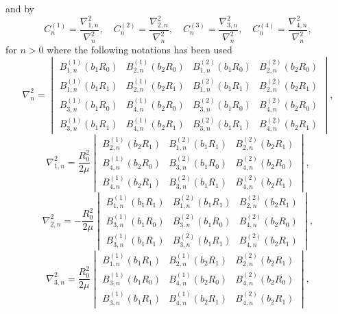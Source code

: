 and by
\begin{equation*}
	C_n^{(1)} = \frac{\nabla^2_{1,n}}{\nabla^2_n},\quad C_n^{(2)} = \frac{\nabla^2_{2,n}}{\nabla^2_n},\quad C_n^{(3)} = \frac{\nabla^2_{3,n}}{\nabla^2_n},\quad C_n^{(4)} = \frac{\nabla^2_{4,n}}{\nabla^2_n},
\end{equation*}
for $n>0$ where the following notations has been used
\begin{equation*}
	\nabla^2_n = \begin{vmatrix}
		B_{1,n}^{(1)}(b_1 R_0) & B_{2,n}^{(1)}(b_2 R_0) & B_{1,n}^{(2)}(b_1 R_0) & B_{2,n}^{(2)}(b_2 R_0)\\
		B_{1,n}^{(1)}(b_1 R_1) & B_{2,n}^{(1)}(b_2 R_1) & B_{1,n}^{(2)}(b_1 R_1) & B_{2,n}^{(2)}(b_2 R_1)\\
		B_{3,n}^{(1)}(b_1 R_0) & B_{4,n}^{(1)}(b_2 R_0) & B_{3,n}^{(2)}(b_1 R_0) & B_{4,n}^{(2)}(b_2 R_0)\\
		B_{3,n}^{(1)}(b_1 R_1) & B_{4,n}^{(1)}(b_2 R_1) & B_{3,n}^{(2)}(b_1 R_1) & B_{4,n}^{(2)}(b_2 R_1)
	\end{vmatrix},
\end{equation*}
\begin{equation*}
	\nabla^2_{1,n} = \frac{R_0^2}{2\mu}\begin{vmatrix}
		B_{2,n}^{(1)}(b_2 R_1) & B_{1,n}^{(2)}(b_1 R_1) & B_{2,n}^{(2)}(b_2 R_1)\\
		B_{4,n}^{(1)}(b_2 R_0) & B_{3,n}^{(2)}(b_1 R_0) & B_{4,n}^{(2)}(b_2 R_0)\\
		B_{4,n}^{(1)}(b_2 R_1) & B_{3,n}^{(2)}(b_1 R_1) & B_{4,n}^{(2)}(b_2 R_1)
	\end{vmatrix},
\end{equation*}
\begin{equation*}
	\nabla^2_{2,n} = -\frac{R_0^2}{2\mu}\begin{vmatrix}
		B_{1,n}^{(1)}(b_1 R_1) & B_{1,n}^{(2)}(b_1 R_1) & B_{2,n}^{(2)}(b_2 R_1)\\
		B_{3,n}^{(1)}(b_1 R_0) & B_{3,n}^{(2)}(b_1 R_0) & B_{4,n}^{(2)}(b_2 R_0)\\
		B_{3,n}^{(1)}(b_1 R_1) & B_{3,n}^{(2)}(b_1 R_1) & B_{4,n}^{(2)}(b_2 R_1)
	\end{vmatrix},
\end{equation*}
\begin{equation*}
	\nabla^2_{3,n} = \frac{R_0^2}{2\mu}\begin{vmatrix}
		B_{1,n}^{(1)}(b_1 R_1) & B_{2,n}^{(1)}(b_2 R_1) & B_{2,n}^{(2)}(b_2 R_1)\\
		B_{3,n}^{(1)}(b_1 R_0) & B_{4,n}^{(1)}(b_2 R_0) & B_{4,n}^{(2)}(b_2 R_0)\\
		B_{3,n}^{(1)}(b_1 R_1) & B_{4,n}^{(1)}(b_2 R_1) & B_{4,n}^{(2)}(b_2 R_1)
	\end{vmatrix},
\end{equation*}
